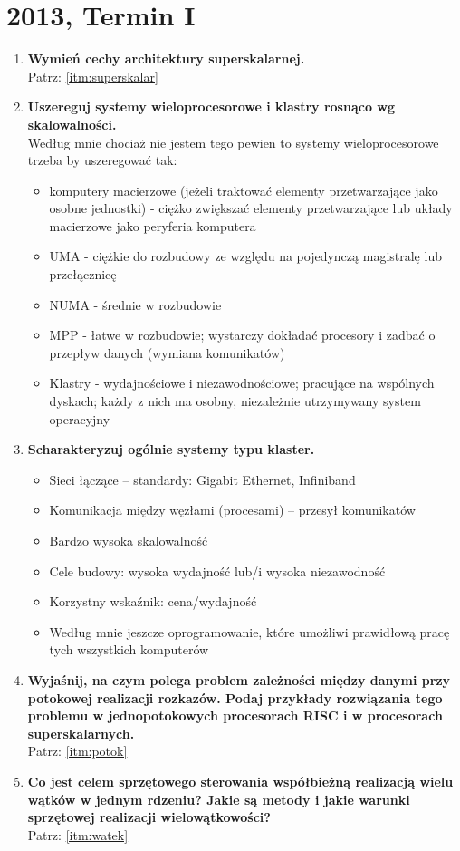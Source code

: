 	\section{2013, Termin I}
		\begin{enumerate}	
			\item \textbf{Wymień cechy architektury superskalarnej.}\\
			Patrz: \ref{itm:superskalar}
			\item \textbf{Uszereguj systemy wieloprocesorowe i klastry rosnąco wg skalowalności.}\\
			Według mnie chociaż nie jestem tego pewien to systemy wieloprocesorowe trzeba by uszeregować tak:
			\begin{itemize}
				\item komputery macierzowe (jeżeli traktować elementy przetwarzające jako osobne jednostki) - ciężko zwiększać elementy przetwarzające lub układy macierzowe jako peryferia komputera
				\item UMA - ciężkie do rozbudowy ze względu na pojedynczą magistralę lub przełącznicę
				\item NUMA - średnie w rozbudowie
				\item MPP - łatwe w rozbudowie; wystarczy dokładać procesory i zadbać o przepływ danych (wymiana komunikatów)
				\item Klastry - wydajnościowe i niezawodnościowe; pracujące na wspólnych dyskach; każdy z nich ma osobny, niezależnie utrzymywany system operacyjny
			\end{itemize}
			\item \textbf{Scharakteryzuj ogólnie systemy typu klaster.}
			\begin{itemize}
				\item Sieci łączące – standardy: Gigabit Ethernet, Infiniband
				\item Komunikacja między węzłami (procesami) – przesył komunikatów
				\item Bardzo wysoka skalowalność
				\item Cele budowy: wysoka wydajność lub/i wysoka niezawodność
				\item Korzystny wskaźnik: cena/wydajność
				\item Według mnie jeszcze oprogramowanie, które umożliwi prawidłową pracę tych wszystkich komputerów
			\end{itemize}
			\item \textbf{Wyjaśnij, na czym polega problem zależności między danymi przy potokowej realizacji rozkazów. Podaj przykłady rozwiązania tego problemu w jednopotokowych procesorach RISC i w procesorach superskalarnych.}\\
			Patrz: \ref{itm:potok}
			
			\item \textbf{Co jest celem sprzętowego sterowania współbieżną realizacją wielu wątków w jednym rdzeniu? Jakie są metody i jakie warunki sprzętowej realizacji wielowątkowości?}\\
			Patrz: \ref{itm:watek}
		\end{enumerate}
		